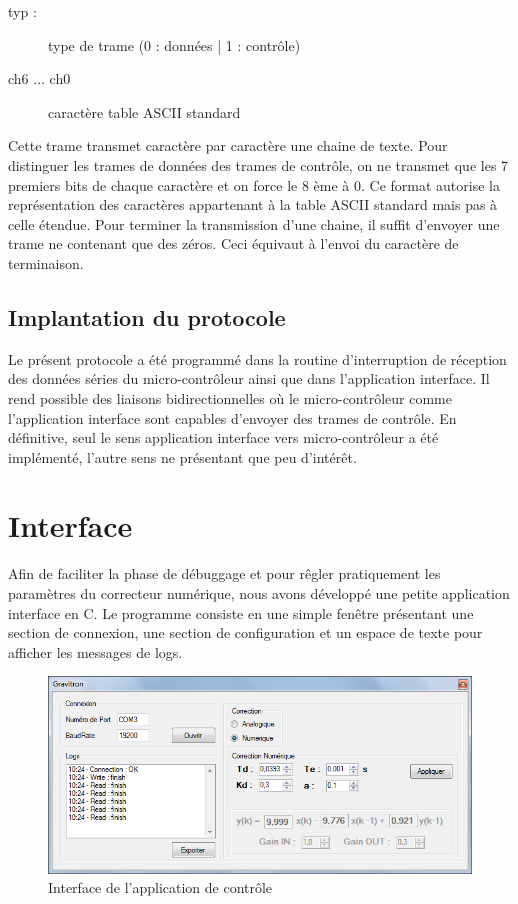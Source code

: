 \documentclass[11pt, french]{article} %
\begin{document}
\begin{itemize}
		\begin{description}
			\item[typ :] type de trame (0 : données | 1 : contrôle)
			\item[ch6 ... ch0] caractère table ASCII standard
		\end{description}

		Cette trame transmet caractère par caractère une chaine de texte. Pour distinguer les trames de données des trames de contrôle, on ne transmet que les 7 premiers bits de chaque caractère et on force le 8 ème à 0. Ce format autorise la représentation des caractères appartenant à la table ASCII standard mais pas à celle étendue. Pour terminer la transmission d'une chaine, il suffit d'envoyer une trame ne contenant que des zéros. Ceci équivaut à l'envoi du caractère de terminaison.

\end{itemize}

\subsection{Implantation du protocole}
Le présent protocole a été programmé dans la routine d'interruption de réception des données séries du micro-contrôleur ainsi que dans l'application interface. Il rend possible des liaisons bidirectionnelles où le micro-contrôleur comme l'application interface sont capables d'envoyer des trames de contrôle. En définitive, seul le sens application interface vers micro-contrôleur a été implémenté, l'autre sens ne présentant que peu d'intérêt.

\section{Interface}
Afin de faciliter la phase de débuggage et pour rêgler pratiquement les paramètres du correcteur numérique, nous avons développé une petite application interface en C. Le programme consiste en une simple fenêtre présentant une section de connexion, une section de configuration et un espace de texte pour afficher les messages de logs.

\begin{figure}[h!]
	\centering
	\includegraphics[width = 12cm]{SolutionNumerique/IHM.png} 
	\caption{Interface de l'application de contrôle}
\end{figure}
\end{document}
